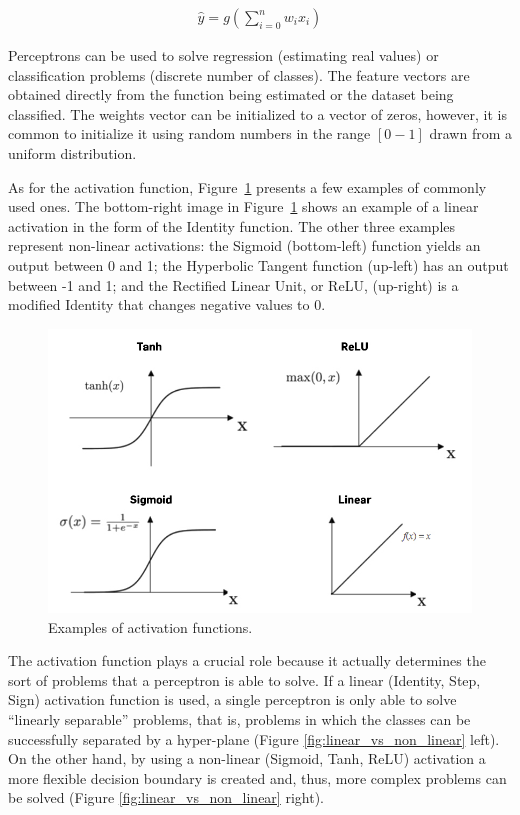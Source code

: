 \begin{align}
    \hat{y} = g(\sum^n_{i=0} w_ix_i)
    \label{eq:pereceptron}
\end{align}

Perceptrons can be used to solve regression (estimating real values) or classification problems (discrete number of classes). The feature vectors are obtained directly from the function being estimated or the dataset being classified. The weights vector can be initialized to a vector of zeros, however, it is common to initialize it using random numbers in the range $[0 - 1]$ drawn from a uniform distribution.

As for the activation function, Figure~\ref{fig:activations} presents a few examples of commonly used ones. The bottom-right image in Figure~\ref{fig:activations} shows an example of a linear activation in the form of the Identity function. The other three examples represent non-linear activations: the Sigmoid (bottom-left) function yields an output between 0 and 1; the Hyperbolic Tangent function (up-left) has an output between -1 and 1; and the Rectified Linear Unit, or ReLU, (up-right) is a modified Identity that changes negative values to 0.

\begin{figure}[!htbp]
    \centering
    \includegraphics[width=.5\textwidth]{Images/activations.jpg}
    \caption{Examples of activation functions.}
    \label{fig:activations}
\end{figure}

The activation function plays a crucial role because it actually determines the sort of problems that a perceptron is able to solve. If a linear (Identity, Step, Sign) activation function is used, a single perceptron is only able to solve ``linearly separable'' problems, that is, problems in which the classes can be successfully separated by a hyper-plane (Figure \ref{fig:linear_vs_non_linear} left). On the other hand, by using a non-linear (Sigmoid, Tanh, ReLU) activation a more flexible decision boundary is created and, thus, more complex problems can be solved (Figure \ref{fig:linear_vs_non_linear} right).

